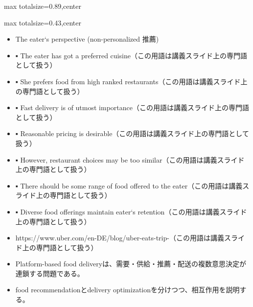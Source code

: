 \begin{minipage}[t]{0.58\textwidth}
\begin{adjustbox}{max totalsize={\textwidth}{0.89\textheight},center}
\begin{minipage}{\textwidth}
\end{minipage}
\end{adjustbox}
\end{minipage}


\clearpage
{}
\begin{minipage}[t]{0.405\textwidth}
\begin{adjustbox}{max totalsize={\textwidth}{0.43\textheight},center}
\begin{minipage}{\textwidth}\scriptsize
{}\begin{itemize}
\item The eater‘s perspective (non-personalized 推薦)
\item ▪ The eater has got a preferred cuisine（この用語は講義スライド上の専門語として扱う）
\item ▪ She prefers food from high ranked restaurants（この用語は講義スライド上の専門語として扱う）
\item ▪ Fast delivery is of utmost importance（この用語は講義スライド上の専門語として扱う）
\item ▪ Reasonable pricing is desirable（この用語は講義スライド上の専門語として扱う）
\item ▪ However, restaurant choices may be too similar（この用語は講義スライド上の専門語として扱う）
\item ▪ There should be some range of food offered to the eater（この用語は講義スライド上の専門語として扱う）
\item ▪ Diverse food offerings maintain eater‘s retention（この用語は講義スライド上の専門語として扱う）
\item https://www.uber.com/en-DE/blog/uber-eats-trip-（この用語は講義スライド上の専門語として扱う）
\end{itemize}\begin{itemize}
\item Platform-based food deliveryは、需要・供給・推薦・配送の複数意思決定が連鎖する問題である。
\item food recommendationとdelivery optimizationを分けつつ、相互作用を説明する。
\end{itemize}
\end{minipage}
\end{adjustbox}
\end{minipage}\hfill

